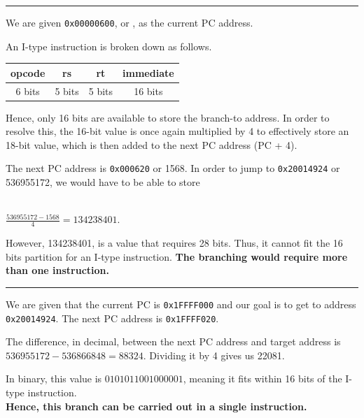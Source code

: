 \documentclass[11pt]{exam}
\newcommand{\cc}[1]{\texttt{#1}}
\newcounter{questionCounter}
\newcounter{partCounter}[questionCounter]
\newenvironment{namedquestion}[1]{%
    \addtocounter{questionCounter}{1}%
    \setcounter{partCounter}{0}%
    \vspace{.2in}%
        \noindent{\bf #1}%
    \vspace{0.3em} \hrule \vspace{.1in}%
}{}
\begin{document}
\begin{namedquestion}{Question 2.41}
We are given \cc{0x00000600}, or \cc{}, as the current PC address.

An I-type instruction is broken down as follows.

\begingroup
    \medskip
    \centering
    \def\arraystretch{1.5}
        \begin{tabular}{cccc}
            \toprule
            opcode & rs & rt & immediate\\
            \midrule
            6 bits & 5 bits & 5 bits & 16 bits\\
            \bottomrule
        \end{tabular}
    \label{fig:c2table2}
    \medskip
\endgroup

Hence, only 16 bits are available to store the branch-to address. In order to resolve this, the 16-bit value is once again multiplied by 4 to effectively store an 18-bit value, which is then added to the next PC address (PC + 4). 

The next PC address is \cc{0x000620} or 1568. In order to jump to \cc{0x20014924} or 536955172, we would have to be able to store 

\\$\frac{536955172-1568}{4} = 134238401$.

However, 134238401, is a value that requires 28 bits. Thus, it cannot fit the 16 bits partition for an I-type instruction. \textbf{The branching would require more than one instruction.} 

\end{namedquestion}

\begin{namedquestion}{Question 2.42}
We are given that the current PC is \cc{0x1FFFF000} and our goal is to get to address \cc{0x20014924}. The next PC address is \cc{0x1FFFF020}.

The difference, in decimal, between the next PC address and target address is $536955172-536866848 = 88324$. Dividing it by 4 gives us 22081. 

In binary, this value is $0101 0110 0100 0001$, meaning it fits within 16 bits of the I-type instruction. \\

\textbf{Hence, this branch can be carried out in a single instruction.}
\end{namedquestion}

\printbibliography
\end{document}
